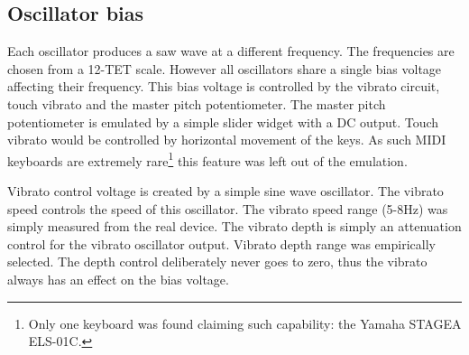 \documentclass[11pt,a4paper]{article}
\begin{document}



\subsection{Oscillator bias}
\label{section:oscillator-bias}

Each oscillator produces a saw wave at a different frequency. The frequencies are chosen from a 12-TET scale. However all oscillators share a single bias voltage affecting their frequency. This bias voltage is controlled by the vibrato circuit, touch vibrato and the master pitch potentiometer. The master pitch potentiometer is emulated by a simple slider widget with a DC output. Touch vibrato would be controlled by horizontal movement of the keys. As such MIDI keyboards are extremely rare\footnote{Only one keyboard was found claiming such capability: the Yamaha STAGEA ELS-01C.} this feature was left out of the emulation.

Vibrato control voltage is created by a simple sine wave oscillator. The vibrato speed controls the speed of this oscillator. The vibrato speed range (5-8Hz) was simply measured from the real device. The vibrato depth is simply an attenuation control for the vibrato oscillator output. Vibrato depth range was empirically selected. The depth control deliberately never goes to zero, thus the vibrato always has an effect on the bias voltage.


\end{document}

